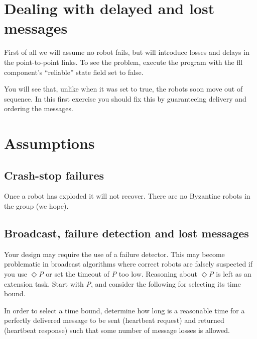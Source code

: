 \documentclass[a4paper]{article}
\begin{document}
\section{Dealing with delayed and lost messages} %
\label{sec:dealing_with_unreliable_links}

First of all we will assume no robot fails, but will introduce losses and
delays in the point-to-point links. To see the problem, execute the program
with the fll component's ``reliable'' state field set to false.

You will see that, unlike when it was set to true, the robots soon move out
of sequence. In this first exercise you should fix this by guaranteeing
delivery and ordering the messages.










\section{Assumptions} %
\label{sec:assumptions}

\subsection{Crash-stop failures} %
\label{sub:crash_stop_failures}

Once a robot has exploded it will not recover. There are no Byzantine robots
in the group (we hope).


\subsection{Broadcast, failure detection and lost messages} %
\label{subsec:lost_messages}

Your design may require the use of a failure detector. This may become
problematic in broadcast algorithms where correct robots are falsely suspected
if you use \emph{$\Diamond$P} or set the timeout of \emph{P} too low.
Reasoning about \emph{$\Diamond$P} is left as an extension task. Start with
\emph{P}, and consider the following for selecting its time bound.

In order to select a time bound, determine how long is a reasonable time for
a perfectly delivered message to be sent (heartbeat request) and returned
(heartbeat response) such that some number of message losses is allowed.
\end{document}

